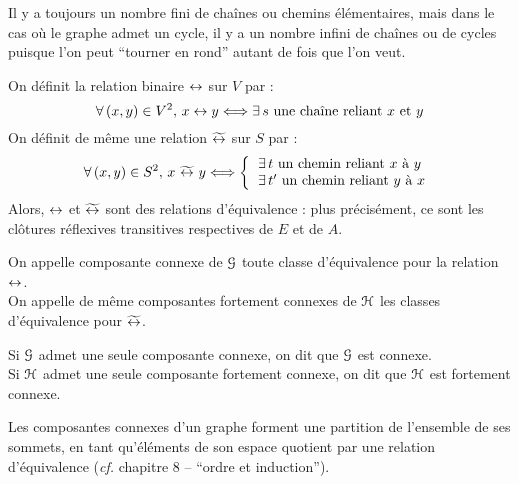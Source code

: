 		\begin{Remarque}
			Il y a toujours un nombre fini de chaînes ou chemins élémentaires, mais dans le cas où le graphe admet un cycle, il y a un nombre infini de chaînes ou de cycles puisque l'on peut ``tourner en rond'' autant de fois que l'on veut.
		\end{Remarque}
		
		\pagebreak
		\begin{Propriete}
			On définit la relation binaire \(\leftrightarrow\) sur \(V\) par :
				\[
					\forall\,(x,y)\in V^2,\, x \leftrightarrow y \Longleftrightarrow \exists\, s \text{ une chaîne reliant \(x\) et \(y\)}
				\]
			On définit de même une relation \(\widetilde{\leftrightarrow}\) sur \(S\) par :
				\[
				\forall\,(x,y)\in S^2,\, x \ \acceso \ y\iff
					\left\{ \begin{tabular}[h]{l}
						\(\exists\, t \text{ un chemin reliant \(x\) à \(y\)}\) \\
						\(\exists\, t' \text{ un chemin reliant \(y\) à \(x\)}\)
					\end{tabular} \right.
				\]
			Alors, \(\leftrightarrow\) et \(\widetilde{\leftrightarrow}\) sont des relations d'équivalence : plus précisément, ce sont les clôtures réflexives transitives respectives de \(E\) et de \(A\).
		\end{Propriete}
	
		\begin{Preuve}
		\end{Preuve}
	
		\begin{Definition}
			On appelle composante connexe de \(\EuScript{G}\) toute classe d'équivalence pour la relation \(\leftrightarrow\). \\
			On appelle de même composantes fortement connexes de \(\EuScript{H}\) les classes d'équivalence pour \(\widetilde{\leftrightarrow}\).
		\end{Definition}
	
		\begin{Definition}
			Si \(\EuScript{G}\) admet une seule composante connexe, on dit que \(\EuScript{G}\) est connexe. \\
			Si \(\EuScript{H}\) admet une seule composante fortement connexe, on dit que \(\EuScript{H}\) est fortement connexe.
		\end{Definition}
		
		\begin{Remarque}
			Les composantes connexes d'un graphe forment une partition de l'ensemble de ses sommets, en tant qu'éléments de son espace quotient par une relation d'équivalence (\emph{cf.} chapitre 8 -- ``ordre et induction'').
		\end{Remarque}
		
